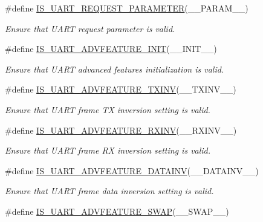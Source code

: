 \begin{DoxyCompactItemize}
\#define \mbox{\hyperlink{group___u_a_r_t___private___macros_ga5cf62c9c598753525888cc7c24be3cb2}{I\+S\+\_\+\+U\+A\+R\+T\+\_\+\+R\+E\+Q\+U\+E\+S\+T\+\_\+\+P\+A\+R\+A\+M\+E\+T\+ER}}(\+\_\+\+\_\+\+P\+A\+R\+A\+M\+\_\+\+\_\+)
\begin{DoxyCompactList}\small\item\em Ensure that U\+A\+RT request parameter is valid. \end{DoxyCompactList}\item 
\#define \mbox{\hyperlink{group___u_a_r_t___private___macros_gad91bec43fbbaa25cec138ef8fcfbdad5}{I\+S\+\_\+\+U\+A\+R\+T\+\_\+\+A\+D\+V\+F\+E\+A\+T\+U\+R\+E\+\_\+\+I\+N\+IT}}(\+\_\+\+\_\+\+I\+N\+I\+T\+\_\+\+\_\+)
\begin{DoxyCompactList}\small\item\em Ensure that U\+A\+RT advanced features initialization is valid. \end{DoxyCompactList}\item 
\#define \mbox{\hyperlink{group___u_a_r_t___private___macros_ga4295a61b0afe152975609cedb9034fdc}{I\+S\+\_\+\+U\+A\+R\+T\+\_\+\+A\+D\+V\+F\+E\+A\+T\+U\+R\+E\+\_\+\+T\+X\+I\+NV}}(\+\_\+\+\_\+\+T\+X\+I\+N\+V\+\_\+\+\_\+)
\begin{DoxyCompactList}\small\item\em Ensure that U\+A\+RT frame TX inversion setting is valid. \end{DoxyCompactList}\item 
\#define \mbox{\hyperlink{group___u_a_r_t___private___macros_ga7f53ad0eca57b7ffabcae9007b7bbfa6}{I\+S\+\_\+\+U\+A\+R\+T\+\_\+\+A\+D\+V\+F\+E\+A\+T\+U\+R\+E\+\_\+\+R\+X\+I\+NV}}(\+\_\+\+\_\+\+R\+X\+I\+N\+V\+\_\+\+\_\+)
\begin{DoxyCompactList}\small\item\em Ensure that U\+A\+RT frame RX inversion setting is valid. \end{DoxyCompactList}\item 
\#define \mbox{\hyperlink{group___u_a_r_t___private___macros_ga8f6cd85ae5ce7f8dd0ed9227ef5154f6}{I\+S\+\_\+\+U\+A\+R\+T\+\_\+\+A\+D\+V\+F\+E\+A\+T\+U\+R\+E\+\_\+\+D\+A\+T\+A\+I\+NV}}(\+\_\+\+\_\+\+D\+A\+T\+A\+I\+N\+V\+\_\+\+\_\+)
\begin{DoxyCompactList}\small\item\em Ensure that U\+A\+RT frame data inversion setting is valid. \end{DoxyCompactList}\item 
\#define \mbox{\hyperlink{group___u_a_r_t___private___macros_gaf095ad39d3035f722c6976921a84dbea}{I\+S\+\_\+\+U\+A\+R\+T\+\_\+\+A\+D\+V\+F\+E\+A\+T\+U\+R\+E\+\_\+\+S\+W\+AP}}(\+\_\+\+\_\+\+S\+W\+A\+P\+\_\+\+\_\+)

\end{DoxyCompactItemize}
